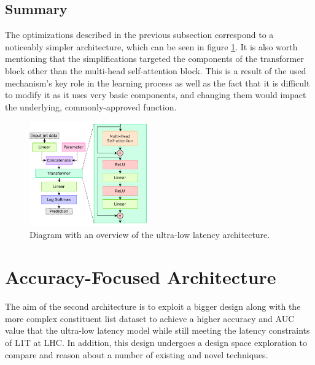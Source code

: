 \todofig{|}
\todofig{|}
\todofig{|}
\todofig{|}

\subsection{Summary}
The optimizations described in the previous subsection correspond to a noticeably simpler architecture, which can be seen in figure \ref{fig:constituent-net-simplified}. It is also worth mentioning that the simplifications targeted the components of the transformer block other than the multi-head self-attention block. This is a result of the used mechanism's key role in the learning process as well as the fact that it is difficult to modify it as it uses very basic components, and changing them would impact the underlying, commonly-approved function.

\begin{figure}[hpt!]
  \centering
  \includegraphics[trim={0cm 0cm 0cm 0cm}, width=0.45\textwidth, center]{models/constituent_net_simplified.pdf}
  \caption{Diagram with an overview of the ultra-low latency architecture.}
  \label{fig:constituent-net-simplified}
\end{figure}


\section{Accuracy-Focused Architecture}\label{accuracy-focused-model}
The aim of the second architecture is to exploit a bigger design along with the more complex constituent list dataset to achieve a higher accuracy and AUC value that the ultra-low latency model while still meeting the latency constraints of L1T at LHC. In addition, this design undergoes a design space exploration to compare and reason about a number of existing and novel techniques.

